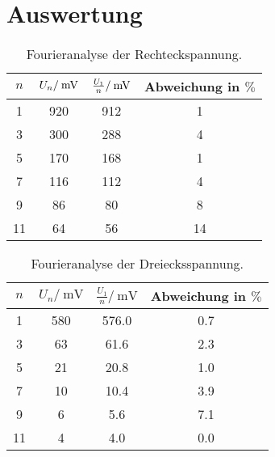\section{Auswertung}
\label{sec:Auswertung}
\begin{table}
	\centering
	\begin{tabular}{S[table-format=2.0] S[table-format=3.0] S[table-format=3.0] S[table-format=2.2]}
	\toprule
{$n$} & {$U_n/\:\si{\milli{\volt}}$} & {$\frac{U_1}{n}/\:\si{\milli{\volt}}$} & {Abweichung in $\%$}\\
	 & 920 & 912 &  1\\
 3 & 300 & 288 &  4\\
 5 & 170 & 168 &  1\\
 7 & 116 & 112 &  4\\
 9 &  86 &  80 &  8\\
11 &  64 &  56 & 14\\
	\bottomrule
	\end{tabular}
	\caption{Fourieranalyse der Rechteckspannung.}
	\label{tab:FA_RE}
\end{table}
 
\begin{table}
	\centering
	\begin{tabular}{S[table-format=2.0] S[table-format=3.0] S[table-format=3.1] S[table-format=1.2] }
	\toprule
	{$n$} & {$U_n/\:\si{\milli\volt}$} & {$\frac{U_1}{n}/\:\si{\milli\volt}$} & {Abweichung in $\%$}\\
	 & 580 & 576.0 & 0.7\\
 3 &  63 &  61.6 & 2.3\\
 5 &  21 &  20.8 & 1.0\\
 7 &  10 &  10.4 & 3.9\\
 9 &   6 &   5.6 & 7.1\\
11 &   4 &   4.0 & 0.0\\
	\bottomrule
	\end{tabular}
	\caption{Fourieranalyse der Dreiecksspannung.}
	\label{tab:FA_RE}
\end{table}



